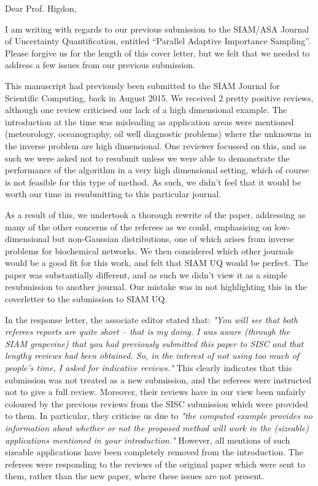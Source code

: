 \documentclass{letter}
\begin{document}
\date{}
\begin{letter}{ }

\opening{Dear Prof. Higdon,}

I am writing with regards to our previous submission to the SIAM/ASA Journal of Uncertainty Quantification, entitled ``Parallel Adaptive Importance Sampling''. Please forgive us for the length of this cover letter, but we felt that we needed to address a few issues from our previous submission.

This manuscript had previously been submitted to the SIAM Journal for Scientific Computing, back in August 2015. We received 2 pretty positive reviews, although one review criticised our lack of a high dimensional example. The introduction at the time was misleading as application areas were mentioned (meteorology, oceanography, oil well diagnostic problems) where the unknowns in the inverse problem are high dimensional. One reviewer focussed on this, and as such we were asked not to resubmit unless we were able to demonstrate the performance of the algorithm in a very high dimensional setting, which of course is not feasible for this type of method. As such, we didn't feel that it would be worth our time in resubmitting to this particular journal.

As a result of this, we undertook a thorough rewrite of the paper, addressing as many of the other concerns of the referees as we could, emphasising on low-dimensional but non-Gaussian distributions, one of which arises from inverse problems for biochemical networks. We then considered which other journals would be a good fit for this work, and felt that SIAM UQ would be perfect. The paper was substantially different, and as such we didn't view it as a simple resubmission to another journal. Our mistake was in not highlighting this in the coverletter to the submission to SIAM UQ.

In the response letter, the associate editor stated that: \emph{"You will see that both referees reports are quite short -- that is my doing. I was aware (through the SIAM grapevine) that you had previously submitted this paper to SISC and that lengthy reviews had been obtained. So, in the interest of not using too much of people's time, I asked for indicative reviews."} This clearly indicates that this submission was not treated as a new submission, and the referees were instructed not to give a full review. Moreover, their reviews have in our view been unfairly coloured by the previous reviews from the SISC submission which were provided to them. In particular, they criticise us due to \emph{"the computed example provides no information about whether or not the proposed method will work in the (sizeable) applications mentioned in your introduction."} However, all mentions of such sizeable applications have been completely removed from the introduction. The referees were responding to the reviews of the original paper which were sent to them, rather than the new paper, where these issues are not present.


\end{letter}
\end{document}
